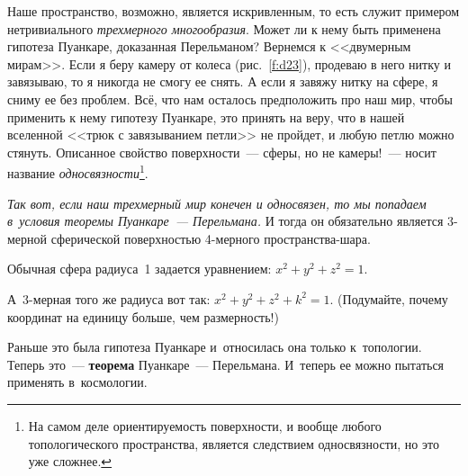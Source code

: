 Наше пространство, возможно, является искривленным, то есть служит примером
нетривиального {\em трехмерного многообразия}. Может ли к нему быть применена
гипотеза Пуанкаре, доказанная Перельманом? Вернемся к <<двумерным мирам>>.
Если я беру камеру от колеса (рис.~\ref{f:d23}), продеваю в него нитку и завязываю, то я
никогда не смогу ее снять. А если я завяжу нитку на сфере, я сниму ее без проблем.
Всё, что нам осталось предположить про наш мир, чтобы применить к нему гипотезу
Пуанкаре, это принять на веру, что в нашей вселенной <<трюк с завязыванием петли>>
не пройдет, и любую петлю можно стянуть.  Описанное свойство поверхности~--- сферы, но не камеры!~--- носит название
\textit{односвязности}\footnote{На самом деле ориентируемость поверхности, и вообще любого
топологического пространства, является следствием односвязности, но это уже сложнее.}.


\textit{Так вот, если наш трехмерный мир конечен и односвязен, то мы попадаем в~условия теоремы
Пуанкаре~--- Перельмана.}
 И тогда он обязательно является 3-мерной сферической поверхностью
4-мерного пространства-шара.

Обычная сфера радиуса~1 задается уравнением: $x^{2}+y^{2}+z^{2}=1$.

А~3-мерная того же радиуса вот так: $x^{2}+y^{2}+z^{2}+k^{2}=1$. (Подумайте, почему координат на единицу больше, чем размерность!)

Раньше это была гипотеза Пуанкаре и~относилась она только к~топологии. Теперь это~--- \textbf{теорема}
Пуанкаре~--- Перельмана. И~теперь ее можно пытаться применять в~космологии.

\endinput
